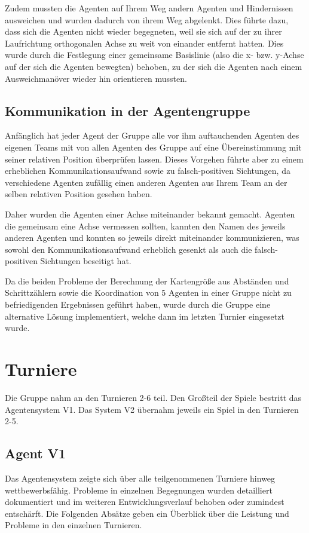 \documentclass[runningheads]{llncs}
\begin{document}
Zudem mussten die Agenten auf Ihrem Weg andern Agenten und Hindernissen ausweichen und wurden dadurch von ihrem Weg abgelenkt. Dies führte dazu, dass sich die Agenten nicht wieder begegneten,
weil sie sich auf der zu ihrer Laufrichtung orthogonalen Achse zu weit von einander entfernt hatten. Dies wurde durch die Festlegung einer gemeinsame Basislinie (also die x- bzw. y-Achse auf der sich die Agenten bewegten) behoben, zu der sich die Agenten nach einem Ausweichmanöver wieder hin orientieren mussten.

\subsection{Kommunikation in der Agentengruppe}
Anfänglich hat jeder Agent der Gruppe alle vor ihm auftauchenden Agenten des eigenen Teams mit von allen Agenten des Gruppe auf eine Übereinstimmung mit seiner relativen Position überprüfen lassen. Dieses Vorgehen führte aber zu einem erheblichen Kommunikationsaufwand sowie zu falsch-positiven Sichtungen, da verschiedene Agenten zufällig einen anderen Agenten aus Ihrem Team an der selben relativen Position gesehen haben.

Daher wurden die Agenten einer Achse miteinander bekannt gemacht. Agenten die gemeinsam eine Achse vermessen sollten, kannten den Namen des jeweils anderen Agenten und konnten so jeweils direkt miteinander kommunizieren, was sowohl den Kommunikationsaufwand erheblich gesenkt als  auch die falsch-positiven Sichtungen beseitigt hat.

Da die beiden Probleme der Berechnung der Kartengröße aus Abständen und Schrittzählern sowie die  Koordination von 5 Agenten in einer Gruppe nicht zu befriedigenden Ergebnissen geführt haben, wurde durch die Gruppe eine alternative Lösung implementiert, welche dann im letzten Turnier eingesetzt wurde.

\section{Turniere}\label{Turniere}
Die Gruppe nahm an den Turnieren 2-6 teil. Den Großteil der Spiele bestritt das Agentensystem V1. Das System V2 übernahm jeweils ein Spiel in den Turnieren 2-5. 

\subsection{Agent V1}
Das Agentensystem zeigte sich über alle teilgenommenen Turniere hinweg wettbewerbsfähig. Probleme in einzelnen Begegnungen wurden detailliert dokumentiert und im weiteren Entwicklungsverlauf behoben oder zumindest entschärft. Die Folgenden Absätze geben ein Überblick über die Leistung und Probleme in den einzelnen Turnieren.
\end{document}
